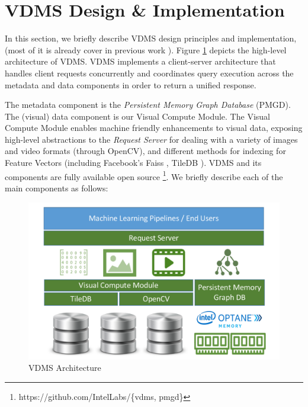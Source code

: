 \section{VDMS Design \& Implementation}
\label{arch}

In this section, we briefly describe VDMS design principles and implementation,
(most of it is already cover in previous work \cite{vdms-nips}).
Figure \ref{fig:arch} depicts the high-level architecture of VDMS.
VDMS implements a client-server architecture that handles client
requests concurrently and coordinates query execution across
the metadata and data components in order to return a unified response.

The metadata component is the \textit{Persistent Memory Graph
Database} (PMGD). The (visual) data component is our Visual Compute Module.
The Visual Compute Module enables machine friendly enhancements to
visual data, exposing high-level abstractions to the \textit{Request Server} for
dealing with a variety of images and video formats (through OpenCV),
and different methods for indexing for Feature Vectors
(including Facebook's Faiss \cite{faiss}, TileDB \cite{TileDB}).
VDMS and its components are fully available open source
\footnote{https://github.com/IntelLabs/\{vdms, pmgd\}}.
We briefly describe each of the main components as follows:

\begin{figure}[]
\centering
\includegraphics[width=1\columnwidth]{figures/vdms_arch.pdf}
\caption{VDMS Architecture}
\label{fig:arch}
\end{figure}

